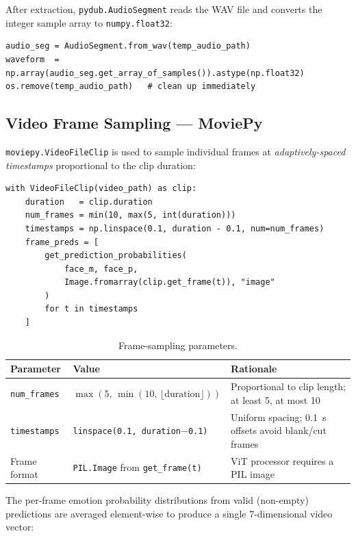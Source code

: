 \documentclass[12pt,a4paper]{article}
\begin{document}
After extraction, \texttt{pydub.AudioSegment} reads the WAV file and converts
the integer sample array to \texttt{numpy.float32}:

\begin{lstlisting}[caption={Conversion from WAV to float32 NumPy array.}]
audio_seg = AudioSegment.from_wav(temp_audio_path)
waveform  = np.array(audio_seg.get_array_of_samples()).astype(np.float32)
os.remove(temp_audio_path)   # clean up immediately
\end{lstlisting}

\subsection{Video Frame Sampling — MoviePy}

\texttt{moviepy.VideoFileClip} is used to sample individual frames at
\textit{adaptively-spaced timestamps} proportional to the clip duration:

\begin{lstlisting}[caption={Adaptive frame sampling with MoviePy.}]
with VideoFileClip(video_path) as clip:
    duration   = clip.duration
    num_frames = min(10, max(5, int(duration)))
    timestamps = np.linspace(0.1, duration - 0.1, num=num_frames)
    frame_preds = [
        get_prediction_probabilities(
            face_m, face_p,
            Image.fromarray(clip.get_frame(t)), "image"
        )
        for t in timestamps
    ]
\end{lstlisting}

\begin{table}[H]
\centering
\caption{Frame-sampling parameters.}
\label{tab:frames}
\begin{tabular}{lll}
\toprule
\textbf{Parameter} & \textbf{Value} & \textbf{Rationale} \\
\midrule
\texttt{num\_frames} & $\max(5,\,\min(10,\,\lfloor\text{duration}\rfloor))$ & Proportional to clip length; at least 5, at most 10 \\
\texttt{timestamps}  & \texttt{linspace(0.1, duration$-$0.1)} & Uniform spacing; 0.1~s offsets avoid blank/cut frames \\
Frame format & \texttt{PIL.Image} from \texttt{get\_frame(t)} & ViT processor requires a PIL image \\
\bottomrule
\end{tabular}
\end{table}

The per-frame emotion probability distributions from valid (non-empty)
predictions are averaged element-wise to produce a single 7-dimensional
video vector:
\end{document}
